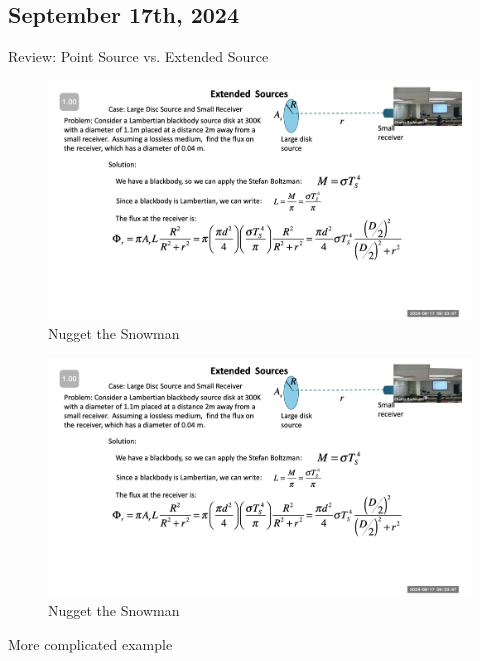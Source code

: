 \documentclass{article}
\begin{document}
\subsection{September 17th, 2024}

Review: Point Source vs. Extended Source 
\begin{figure}[h!]
\centering
\includegraphics[scale=.6]{Radiometry/Week4/Notes/Sept17/SimpleExtendedSource.png}
\caption{Nugget the Snowman}
\label{fig:Simple Extended Source}
\end{figure}


\begin{figure}[h!]
\centering
\includegraphics[scale=.6]{Radiometry/Week4/Notes/Sept17/SimpleExtendedSource.png}
\caption{Nugget the Snowman}
\label{fig:Simple Extended Source}
\end{figure}



\clearpage 

More complicated example 
\end{document}
